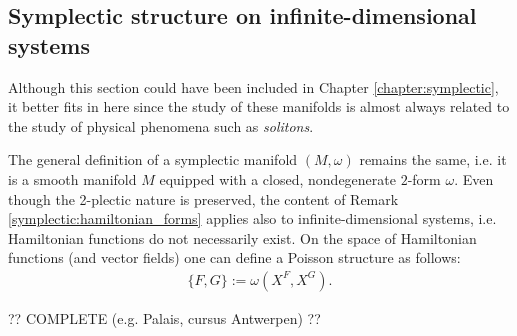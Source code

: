 \subsection{Symplectic structure on infinite-dimensional systems}

    Although this section could have been included in Chapter \ref{chapter:symplectic}, it better fits in here since the study of these manifolds is almost always related to the study of physical phenomena such as \textit{solitons}.

    The general definition of a symplectic manifold $(M,\omega)$ remains the same, i.e. it is a smooth manifold $M$ equipped with a closed, nondegenerate $2$-form $\omega$. Even though the 2-plectic nature is preserved, the content of Remark \ref{symplectic:hamiltonian_forms} applies also to infinite-dimensional systems, i.e. Hamiltonian functions do not necessarily exist. On the space of Hamiltonian functions (and vector fields) one can define a Poisson structure as follows:
    \begin{gather}
        \{F,G\} := \omega(X^F,X^G).
    \end{gather}

    ?? COMPLETE (e.g. Palais, cursus Antwerpen) ??